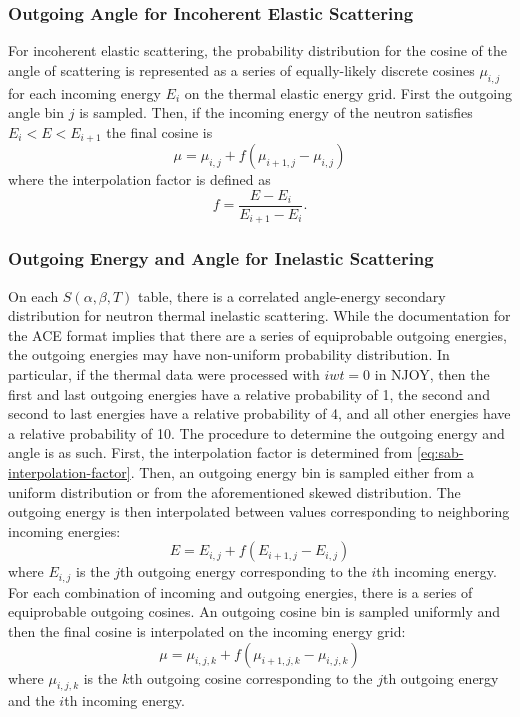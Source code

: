 \subsubsection{Outgoing Angle for Incoherent Elastic Scattering}

For incoherent elastic scattering, the probability distribution for the cosine
of the angle of scattering is represented as a series of equally-likely discrete
cosines $\mu_{i,j}$ for each incoming energy $E_i$ on the thermal elastic energy
grid. First the outgoing angle bin $j$ is sampled. Then, if the incoming energy
of the neutron satisfies $E_i < E < E_{i+1}$ the final cosine is
\begin{equation}
  \label{eq:incoherent-elastic-angle}
  \mu = \mu_{i,j} + f (\mu_{i+1,j} - \mu_{i,j})
\end{equation}
where the interpolation factor is defined as
\begin{equation}
  \label{eq:sab-interpolation-factor}
  f = \frac{E - E_i}{E_{i+1} - E_i}.
\end{equation}

\subsubsection{Outgoing Energy and Angle for Inelastic Scattering}

On each $S(\alpha,\beta,T)$ table, there is a correlated angle-energy secondary
distribution for neutron thermal inelastic scattering. While the documentation
for the ACE format \cite{lanl-x5-2008-ace} implies that there are a series of
equiprobable outgoing energies, the outgoing energies may have non-uniform
probability distribution. In particular, if the thermal data were processed with
$iwt = 0$ in NJOY, then the first and last outgoing energies have a relative
probability of 1, the second and second to last energies have a relative
probability of 4, and all other energies have a relative probability of 10. The
procedure to determine the outgoing energy and angle is as such. First, the
interpolation factor is determined from
\eqref{eq:sab-interpolation-factor}. Then, an outgoing energy bin is sampled
either from a uniform distribution or from the aforementioned skewed
distribution. The outgoing energy is then interpolated between values
corresponding to neighboring incoming energies:
\begin{equation}
  \label{eq:inelastic-energy}
  E = E_{i,j} + f (E_{i+1,j} - E_{i,j})
\end{equation}
where $E_{i,j}$ is the $j$th outgoing energy corresponding to the $i$th incoming
energy. For each combination of incoming and outgoing energies, there is a
series of equiprobable outgoing cosines. An outgoing cosine bin is sampled
uniformly and then the final cosine is interpolated on the incoming energy grid:
\begin{equation}
  \label{eq:inelastic-angle}
  \mu = \mu_{i,j,k} + f (\mu_{i+1,j,k} - \mu_{i,j,k})
\end{equation}
where $\mu_{i,j,k}$ is the $k$th outgoing cosine corresponding to the $j$th
outgoing energy and the $i$th incoming energy.


